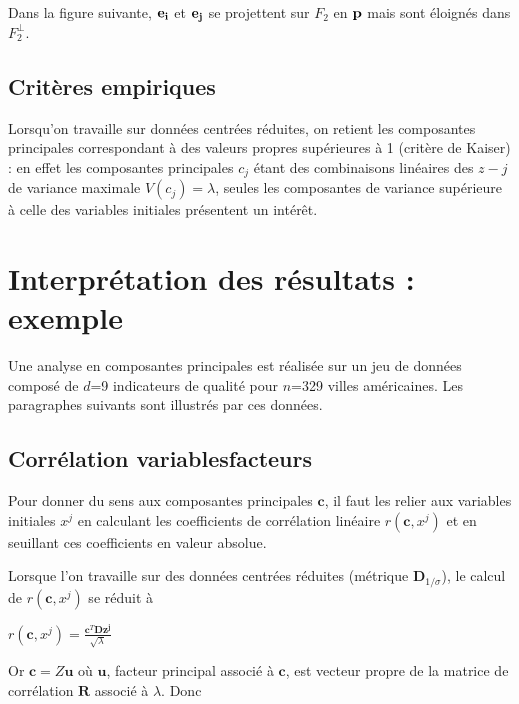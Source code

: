 \documentclass[letterpaper,10pt,english]{jupyterBook}
\begin{document}
\sphinxAtStartPar
Dans la figure suivante, \({\bf e_i} \) et \({\bf e_j}\) se projettent sur \(F_2\) en \({\bf p}\) mais sont éloignés dans \(F_2^\perp\).

\sphinxAtStartPar
{}


\subsection{Critères empiriques}
\label{\detokenize{acp:criteres-empiriques}}
\ignorespaces 
\sphinxAtStartPar
Lorsqu’on travaille sur données centrées réduites, on retient les composantes principales correspondant à des valeurs propres supérieures à 1 (critère de Kaiser) : en effet les composantes principales \(c_j\) étant des combinaisons linéaires des \(z-j\) de variance maximale \(V(c_j)=\lambda\), seules les composantes de variance supérieure à celle des variables initiales présentent un intérêt.


\section{Interprétation des résultats : exemple}
\label{\detokenize{acp:interpretation-des-resultats-exemple}}
\sphinxAtStartPar
Une analyse en composantes principales est réalisée sur un jeu de données composé de \(d\)=9 indicateurs de qualité pour \(n\)=329 villes américaines. Les paragraphes suivants sont illustrés par ces données.


\subsection{Corrélation variables\sphinxhyphen{}facteurs}
\label{\detokenize{acp:correlation-variables-facteurs}}
\sphinxAtStartPar
Pour donner du sens aux composantes principales \(\mathbf{c}\), il faut les relier aux variables initiales \(x^j\) en calculant les coefficients de corrélation linéaire  \(r(\mathbf{c},x^j)\) et en seuillant ces coefficients en valeur absolue.

\sphinxAtStartPar
Lorsque l’on travaille sur des données centrées réduites (métrique \(\mathbf D_{1/\sigma}\)), le calcul de \(r(\mathbf{c},x^j)\) se réduit à

\sphinxAtStartPar
\(r(\mathbf{c},x^j)=\frac{\mathbf{c}^T\mathbf D\mathbf{z^j}}{\sqrt{\lambda}}\)

\sphinxAtStartPar
Or \(\mathbf{c}=Z\mathbf{u}\) où \(\mathbf{u}\), facteur principal associé à \(\mathbf{c}\), est vecteur propre de la matrice de corrélation \(\mathbf R\) associé à \(\lambda\). Donc
\end{document}
